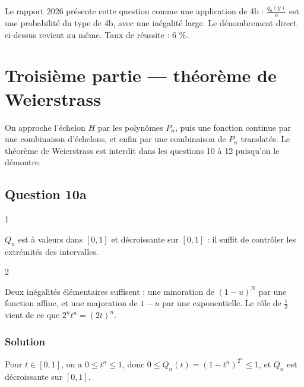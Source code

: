 \documentclass[11pt,a4paper]{article}
\begin{document}
\begin{jury}

Le rapport 2026 présente cette question comme une application de 4b : \(\frac{q_n(y)}n\) est une probabilité du type de 4b, avec une inégalité large. Le dénombrement direct ci-dessus revient au même. Taux de réussite : 6 \%.

\end{jury}

\hypertarget{troisiuxe8me-partie-thuxe9oruxe8me-de-weierstrass}{%
\section{Troisième partie --- théorème de Weierstrass}\label{troisiuxe8me-partie-thuxe9oruxe8me-de-weierstrass}}

On approche l'échelon \(H\) par les polynômes \(P_n\), puis une fonction continue par une combinaison d'échelons, et enfin par une combinaison de \(P_n\) translatés. Le théorème de Weierstrass est interdit dans les questions 10 à 12 puisqu'on le démontre.

\hypertarget{question-10a}{%
\subsection{Question 10a}\label{question-10a}}

\begin{indication}{1}

\(Q_n\) est à valeurs dans \([0,1]\) et décroissante sur \([0,1]\) : il suffit de contrôler les extrémités des intervalles.

\end{indication}

\begin{indication}{2}

Deux inégalités élémentaires suffisent : une minoration de \((1-u)^N\) par une fonction affine, et une majoration de \(1-u\) par une exponentielle. Le rôle de \(\frac12\) vient de ce que \(2^nt^n=(2t)^n\).

\end{indication}

\hypertarget{solution-18}{%
\subsubsection{Solution}\label{solution-18}}

Pour \(t\in[0,1]\), on a \(0\le t^n\le1\), donc \(0\le Q_n(t)=(1-t^n)^{2^n}\le1\), et \(Q_n\) est décroissante sur \([0,1]\).
\end{document}
